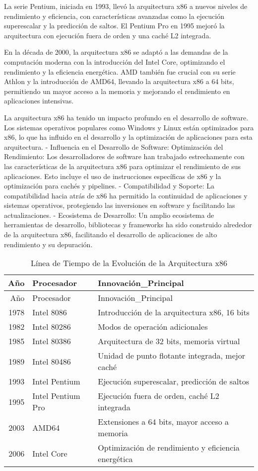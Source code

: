 \documentclass[12pt,twoside]{templates/unerthesis}
\begin{document}
La serie Pentium, iniciada en 1993, llevó la arquitectura x86 a nuevos niveles de rendimiento y eficiencia, con características avanzadas como la ejecución superescalar y la predicción de saltos. El Pentium Pro en 1995 mejoró la arquitectura con ejecución fuera de orden y una caché L2 integrada.

En la década de 2000, la arquitectura x86 se adaptó a las demandas de la computación moderna con la introducción del Intel Core, optimizando el rendimiento y la eficiencia energética. AMD también fue crucial con su serie Athlon y la introducción de AMD64, llevando la arquitectura x86 a 64 bits, permitiendo un mayor acceso a la memoria y mejorando el rendimiento en aplicaciones intensivas.

La arquitectura x86 ha tenido un impacto profundo en el desarrollo de software. Los sistemas operativos populares como Windows y Linux están optimizados para x86, lo que ha influido en el desarrollo y la optimización de aplicaciones para esta arquitectura.
- Influencia en el Desarrollo de Software: Optimización del Rendimiento: Los desarrolladores de software han trabajado estrechamente con las características de la arquitectura x86 para optimizar el rendimiento de sus aplicaciones. Esto incluye el uso de instrucciones específicas de x86 y la optimización para cachés y pipelines.
- Compatibilidad y Soporte: La compatibilidad hacia atrás de x86 ha permitido la continuidad de aplicaciones y sistemas operativos, protegiendo las inversiones en software y facilitando las actualizaciones.
- Ecosistema de Desarrollo: Un amplio ecosistema de herramientas de desarrollo, bibliotecas y frameworks ha sido construido alrededor de la arquitectura x86, facilitando el desarrollo de aplicaciones de alto rendimiento y su depuración.

\begin{longtable}[]{@{}rll@{}}
\caption{\label{tab:tabla-evolucion-x86}Línea de Tiempo de la Evolución de la Arquitectura x86}\tabularnewline
\toprule
Año & Procesador & Innovación\_Principal\tabularnewline
\midrule
\endfirsthead
\toprule
Año & Procesador & Innovación\_Principal\tabularnewline
\midrule
\endhead
1978 & Intel 8086 & Introducción de la arquitectura x86, 16 bits\tabularnewline
1982 & Intel 80286 & Modos de operación adicionales\tabularnewline
1985 & Intel 80386 & Arquitectura de 32 bits, memoria virtual\tabularnewline
1989 & Intel 80486 & Unidad de punto flotante integrada, mejor caché\tabularnewline
1993 & Intel Pentium & Ejecución superescalar, predicción de saltos\tabularnewline
1995 & Intel Pentium Pro & Ejecución fuera de orden, caché L2 integrada\tabularnewline
2003 & AMD64 & Extensiones a 64 bits, mayor acceso a memoria\tabularnewline
2006 & Intel Core & Optimización de rendimiento y eficiencia energética\tabularnewline
\bottomrule
\end{longtable}
\end{document}
